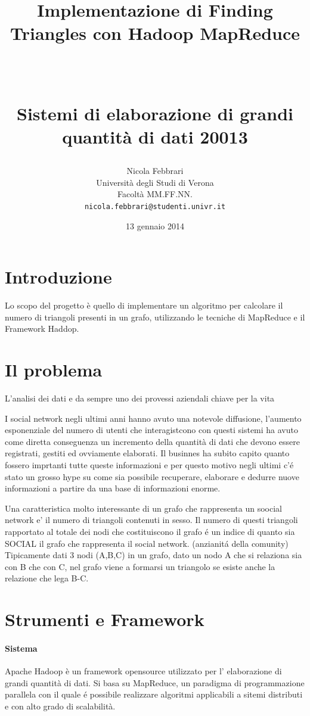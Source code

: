\documentclass[paper=a4, fontsize=11pt]{scrartcl}	%
\title{ \vspace{-1in} 	\usefont{OT1}{bch}{b}{n}
		\huge \strut Implementazione di Finding Triangles con Hadoop MapReduce\strut \\
		\Large \bfseries \strut Sistemi di elaborazione di grandi quantit\`a di dati 20013 \strut
}
\author{ 									\usefont{OT1}{bch}{m}{n}
        Nicola Febbrari\\		\usefont{OT1}{bch}{m}{n}
        Universit\`a degli Studi di Verona\\	\usefont{OT1}{bch}{m}{n}
        Facolt\`a MM.FF.NN.\\
        \texttt{nicola.febbrari@studenti.univr.it}
}
\date{13 gennaio 2014}
\numberwithin{equation}{section}															%
\numberwithin{figure}{section}																%
\numberwithin{table}{section}																%
\begin{document}
\maketitle
\section{Introduzione}
Lo scopo del progetto \`e quello di implementare un algoritmo per calcolare il numero di triangoli presenti in un grafo, utilizzando le tecniche di MapReduce e il Framework Haddop.


\section{Il problema}
L'analisi dei dati e da sempre uno dei provessi aziendali chiave per la vita

I social network negli ultimi anni hanno avuto una notevole diffusione, l'aumento esponenziale del numero di utenti che interagistcono con questi sistemi 
ha avuto come diretta conseguenza un  incremento della quantit\`a di dati che devono essere registrati, gestiti ed ovviamente elaborati.
Il businnes ha subito capito quanto fossero imprtanti tutte queste informazioni e per questo motivo negli ultimi c'\'e stato un grosso hype su come sia 
possibile recuperare, elaborare e dedurre nuove informazioni a partire da una base di informazioni enorme.

Una caratteristica molto interessante di un grafo che rappresenta un soocial network e' il numero di triangoli contenuti in sesso. 
Il numero di questi triangoli rapportato al totale dei nodi che costituiscono il grafo \'e un indice di quanto sia SOCIAL il grafo che rappresenta il social network. (anzianit\'a della comunity)
Tipicamente dati 3 nodi (A,B,C) in un grafo, dato un nodo  A che si relaziona sia con B che con C, nel grafo viene a formarsi un triangolo se esiste anche la relazione che lega B-C.

\section{Strumenti e Framework}
\paragraph{Sistema}
Apache Hadoop \`e un framework opensource utilizzato per l' elaborazione di grandi quantit\`a di dati. 
Si basa su MapReduce, un paradigma di programmazione parallela con il quale \'e possibile realizzare algoritmi applicabili a sitemi distributi e con alto grado di scalabilit\`a.
\end{document}
